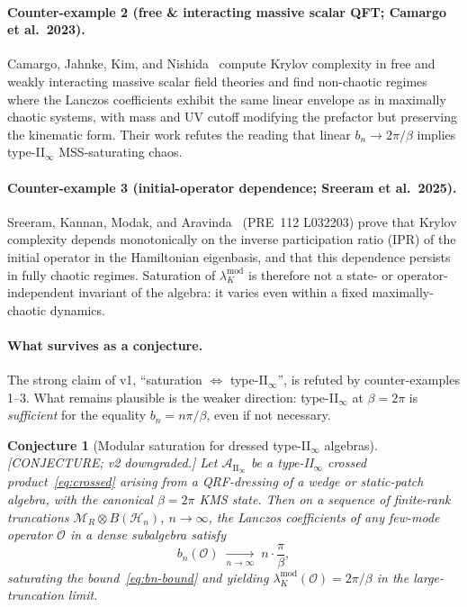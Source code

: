 \documentclass[12pt,a4paper]{article}
\newtheorem{conjecture}{Conjecture}
\begin{document}
\paragraph{Counter-example 2 (free \& interacting massive scalar QFT;
Camargo et al.\ 2023).}
Camargo, Jahnke, Kim, and Nishida~\cite{Camargo2023} compute
Krylov complexity in free and weakly interacting massive scalar
field theories and find non-chaotic regimes where the Lanczos
coefficients exhibit the same linear envelope as in maximally
chaotic systems, with mass and UV cutoff modifying the prefactor
but preserving the kinematic form.
Their work refutes the reading that linear $b_n \to 2\pi/\beta$
implies type-II$_\infty$ MSS-saturating chaos.

\paragraph{Counter-example 3 (initial-operator dependence;
Sreeram et al.\ 2025).}
Sreeram, Kannan, Modak, and Aravinda~\cite{Sreeram2025} (PRE~112
L032203) prove that Krylov complexity depends monotonically on the
inverse participation ratio (IPR) of the initial operator in the
Hamiltonian eigenbasis, and that this dependence persists in fully
chaotic regimes.
Saturation of $\lambda_K^{\mathrm{mod}}$ is therefore not a state-
or operator-independent invariant of the algebra: it varies even
within a fixed maximally-chaotic dynamics.

\paragraph{What survives as a conjecture.}
The strong claim of v1, ``saturation $\Leftrightarrow$ type-II$_\infty$'',
is refuted by counter-examples 1--3.
What remains plausible is the weaker direction: type-II$_\infty$ at
$\beta = 2\pi$ is \emph{sufficient} for the equality
$b_n = n\pi/\beta$, even if not necessary.

\begin{conjecture}[Modular saturation for dressed type-II$_\infty$
algebras]\label{conj:msc-saturation}
\emph{[CONJECTURE; v2 downgraded.]}
Let $\mathcal{A}_{\mathrm{II}_\infty}$ be a type-II$_\infty$ crossed
product~\eqref{eq:crossed} arising from a QRF-dressing of a wedge or
static-patch algebra, with the canonical $\beta = 2\pi$ KMS state.
Then on a sequence of finite-rank truncations
$\mathcal{M}_R \otimes B(\mathcal{H}_n)$, $n \to \infty$, the
Lanczos coefficients of any few-mode operator $\mathcal{O}$ in a
dense subalgebra satisfy
\[
  b_n(\mathcal{O})
  \;\xrightarrow[n\to\infty]{}\;
  n\cdot\frac{\pi}{\beta},
\]
saturating the bound~\eqref{eq:bn-bound} and yielding
$\lambda_K^{\mathrm{mod}}(\mathcal{O}) = 2\pi/\beta$ in the
large-truncation limit.
\end{conjecture}
\end{document}
